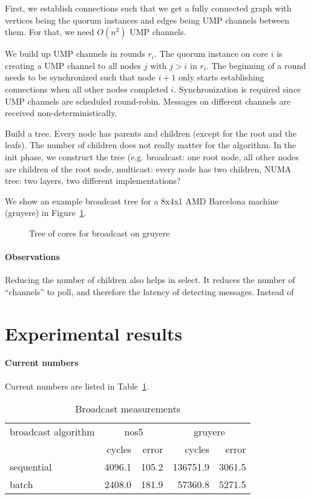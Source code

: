 \documentclass{article}
\begin{document}
First, we establish connections such that we get a fully connected
graph with vertices being the quorum instances and edges being UMP
channels between them. For that, we need $O(n^2)$ UMP channels. 

We build up UMP channels in rounds $r_i$. The quorum instance on core
$i$ is creating a UMP channel to all nodes $j$ with $j>i$ in
$r_i$. The beginning of a round needs to be synchronized such that
node $i+1$ only starts establishing connections when all other nodes
completed $i$. Synchronization is required since UMP channels are
scheduled round-robin. Messages on different channels are received
non-deterministically. 

Build a tree. Every node has parents and children (except for the root
and the leafs). The number of children does not really matter for the
algorithm. In the init phase, we construct the tree (e.g. broadcast:
one root node, all other nodes are children of the root node,
multicast: every node has two children, NUMA tree: two layers, two
different implementations?

We show an example broadcast tree for a 8x4x1 AMD Barcelona machine
(gruyere) in Figure~\ref{fig:qrm_tree_gruyere}.

\begin{figure}
  
  \caption{Tree of cores for broadcast on gruyere}
  \label{fig:qrm_tree_gruyere}
\end{figure}

\paragraph{Observations} Reducing the number of children also helps in
select. It reduces the number of ``channels'' to poll, and therefore
the latency of detecting messages. Instead of

\section{Experimental results}

\paragraph{Current numbers} Current numbers are listed in
Table~\ref{tab:bc_measurements}. 

\begin{table}[htb]
  \centering
  \begin{tabular}{lrrrr}
    \toprule
    broadcast algorithm & \multicolumn{2}{c}{nos5} & \multicolumn{2}{c}{gruyere} \\
      & cycles & error & cycles & error \\
    \midrule
    sequential &  4096.1 &  105.2 & 136751.9 &   3061.5 \\
    batch      &  2408.0 &  181.9 &  57360.8 &   5271.5 \\
    \bottomrule
  \end{tabular}
  \caption{Broadcast measurements}
  \label{tab:bc_measurements}
\end{table}
\end{document}
